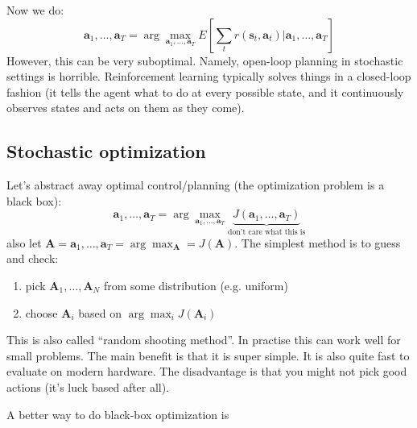 \documentclass{report}
\newcommand{\argmax}{\arg\!\max}
\begin{document}
Now we do:
\begin{equation}
		\bm{a}_1, \dots, \bm{a}_T = \argmax_{\bm{a}_1, \dots, \bm{a}_T} E \left[ 
		\sum_{t}^{} r (\bm{s}_{t}, \bm{a}_{t} ) | \bm{a}_1, \dots, \bm{a}_T \right] 
\end{equation}
However, this can be very suboptimal. Namely, open-loop planning in stochastic settings is horrible.
Reinforcement learning typically solves things in a closed-loop fashion (it tells the agent what to do at every possible state,
and it continuously observes  states and acts on them as they come).

\subsection{Stochastic optimization}
Let's abstract away optimal control/planning (the optimization problem is a black box):
\begin{equation}
		\bm{a}_1, \dots, \bm{a}_T = \argmax_{\bm{a}_1, \dots, \bm{a}_T} \underbrace{J(\bm{a}_1, \dots, \bm{a}_T)}_{\text{don't care what this is}}
\end{equation}
also let $ \bm{A} = \bm{a}_1, \dots, \bm{a}_T =  \argmax_{\bm{A}} = J(\bm{A}) $.
The simplest method is to guess and check:
\begin{enumerate}
		\item pick $\bm{A}_1, \dots, \bm{A}_N $ from some distribution (e.g. uniform)
		\item choose $\bm{A}_i$ based on $\argmax_i J(\bm{A}_i)  $
\end{enumerate}
This is also called ``random shooting method''.
In practise this can work well for small problems.
The main benefit is that it is super simple. It is also quite fast to evaluate on modern hardware.
The disadvantage is that you might not pick good actions (it's luck based after all).

A better way to do black-box optimization is
\end{document}

